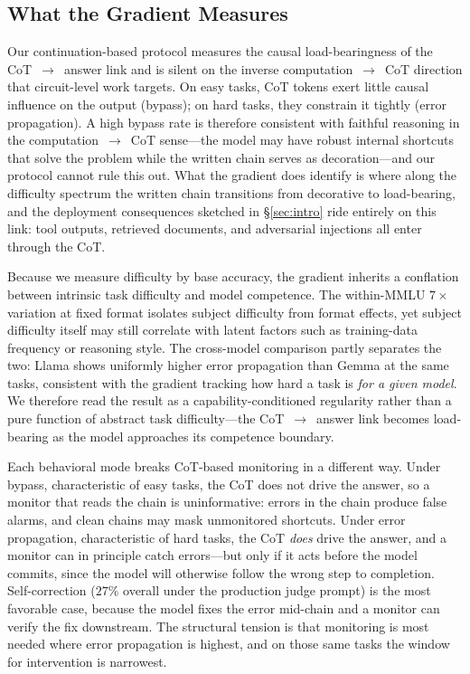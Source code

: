 \documentclass[10pt]{article} %
\begin{document}
\subsection{What the Gradient Measures}

Our continuation-based protocol measures the causal load-bearingness of the CoT~$\to$~answer link and is silent on the inverse computation~$\to$~CoT direction that circuit-level work targets. On easy tasks, CoT tokens exert little causal influence on the output (bypass); on hard tasks, they constrain it tightly (error propagation). A high bypass rate is therefore consistent with faithful reasoning in the computation~$\to$~CoT sense---the model may have robust internal shortcuts that solve the problem while the written chain serves as decoration---and our protocol cannot rule this out. What the gradient does identify is where along the difficulty spectrum the written chain transitions from decorative to load-bearing, and the deployment consequences sketched in \S\ref{sec:intro} ride entirely on this link: tool outputs, retrieved documents, and adversarial injections all enter through the CoT.

Because we measure difficulty by base accuracy, the gradient inherits a conflation between intrinsic task difficulty and model competence. The within-MMLU $7\times$ variation at fixed format isolates subject difficulty from format effects, yet subject difficulty itself may still correlate with latent factors such as training-data frequency or reasoning style. The cross-model comparison partly separates the two: Llama shows uniformly higher error propagation than Gemma at the same tasks, consistent with the gradient tracking how hard a task is \emph{for a given model}. We therefore read the result as a capability-conditioned regularity rather than a pure function of abstract task difficulty---the CoT~$\to$~answer link becomes load-bearing as the model approaches its competence boundary.

Each behavioral mode breaks CoT-based monitoring in a different way. Under bypass, characteristic of easy tasks, the CoT does not drive the answer, so a monitor that reads the chain is uninformative: errors in the chain produce false alarms, and clean chains may mask unmonitored shortcuts. Under error propagation, characteristic of hard tasks, the CoT \emph{does} drive the answer, and a monitor can in principle catch errors---but only if it acts before the model commits, since the model will otherwise follow the wrong step to completion. Self-correction ($27\%$ overall under the production judge prompt) is the most favorable case, because the model fixes the error mid-chain and a monitor can verify the fix downstream. The structural tension is that monitoring is most needed where error propagation is highest, and on those same tasks the window for intervention is narrowest.
\end{document}
